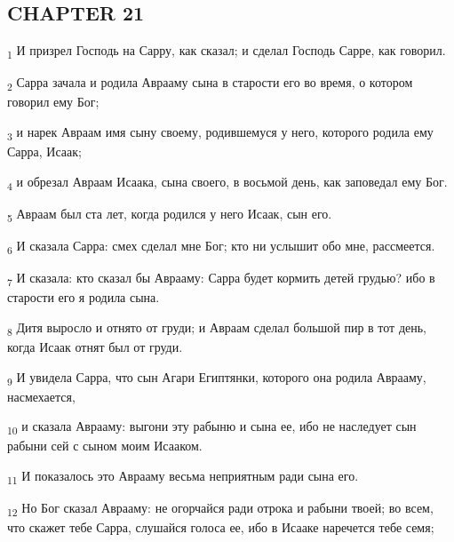 \subsection{CHAPTER 21}
\begin{tcolorbox}
\textsubscript{1} И призрел Господь на Сарру, как сказал; и сделал Господь Сарре, как говорил.
\end{tcolorbox}
\begin{tcolorbox}
\textsubscript{2} Сарра зачала и родила Аврааму сына в старости его во время, о котором говорил ему Бог;
\end{tcolorbox}
\begin{tcolorbox}
\textsubscript{3} и нарек Авраам имя сыну своему, родившемуся у него, которого родила ему Сарра, Исаак;
\end{tcolorbox}
\begin{tcolorbox}
\textsubscript{4} и обрезал Авраам Исаака, сына своего, в восьмой день, как заповедал ему Бог.
\end{tcolorbox}
\begin{tcolorbox}
\textsubscript{5} Авраам был ста лет, когда родился у него Исаак, сын его.
\end{tcolorbox}
\begin{tcolorbox}
\textsubscript{6} И сказала Сарра: смех сделал мне Бог; кто ни услышит обо мне, рассмеется.
\end{tcolorbox}
\begin{tcolorbox}
\textsubscript{7} И сказала: кто сказал бы Аврааму: Сарра будет кормить детей грудью? ибо в старости его я родила сына.
\end{tcolorbox}
\begin{tcolorbox}
\textsubscript{8} Дитя выросло и отнято от груди; и Авраам сделал большой пир в тот день, когда Исаак отнят был от груди.
\end{tcolorbox}
\begin{tcolorbox}
\textsubscript{9} И увидела Сарра, что сын Агари Египтянки, которого она родила Аврааму, насмехается,
\end{tcolorbox}
\begin{tcolorbox}
\textsubscript{10} и сказала Аврааму: выгони эту рабыню и сына ее, ибо не наследует сын рабыни сей с сыном моим Исааком.
\end{tcolorbox}
\begin{tcolorbox}
\textsubscript{11} И показалось это Аврааму весьма неприятным ради сына его.
\end{tcolorbox}
\begin{tcolorbox}
\textsubscript{12} Но Бог сказал Аврааму: не огорчайся ради отрока и рабыни твоей; во всем, что скажет тебе Сарра, слушайся голоса ее, ибо в Исааке наречется тебе семя;
\end{tcolorbox}
